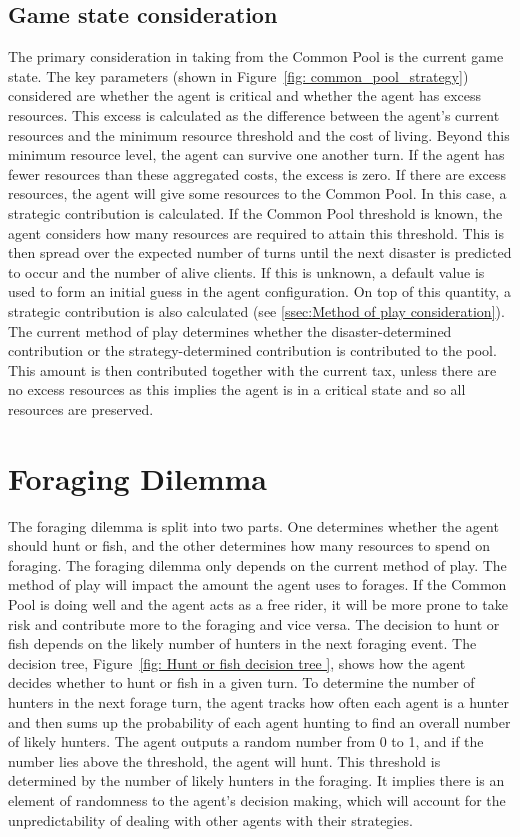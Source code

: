 \subsection{Game state consideration} \label{ssec:Game state consideration}
The primary consideration in taking from the Common Pool is the current game state. The key parameters (shown in Figure~\ref{fig: common_pool_strategy}) considered are whether the agent is critical and whether the agent has excess resources. This excess is calculated as the difference between the agent's current resources and the minimum resource threshold and the cost of living. Beyond this minimum resource level, the agent can survive one another turn. If the agent has fewer resources than these aggregated costs, the excess is zero. If there are excess resources, the agent will give some resources to the Common Pool. In this case, a strategic contribution is calculated. If the Common Pool threshold is known, the agent considers how many resources are required to attain this threshold. This is then spread over the expected number of turns until the next disaster is predicted to occur and the number of alive clients. If this is unknown, a default value is used to form an initial guess in the agent configuration. On top of this quantity, a strategic contribution is also calculated (see \ref{ssec:Method of play consideration}). The current method of play determines whether the disaster-determined contribution or the strategy-determined contribution is contributed to the pool. This amount is then contributed together with the current tax, unless there are no excess resources as this implies the agent is in a critical state and so all resources are preserved.

\section{Foraging Dilemma}
The foraging dilemma is split into two parts. One determines whether the agent should hunt or fish, and the other determines how many resources to spend on foraging. The foraging dilemma only depends on the current method of play. The method of play will impact the amount the agent uses to forages. If the Common Pool is doing well and the agent acts as a free rider, it will be more prone to take risk and contribute more to the foraging and vice versa. The decision to hunt or fish depends on the likely number of hunters in the next foraging event. The decision tree, Figure~\ref{fig: Hunt or fish decision tree }, shows how the agent decides whether to hunt or fish in a given turn. To determine the number of hunters in the next forage turn, the agent tracks how often each agent is a hunter and then sums up the probability of each agent hunting to find an overall number of likely hunters. The agent outputs a random number from 0 to 1, and if the number lies above the threshold, the agent will hunt. This threshold is determined by the number of likely hunters in the foraging. It implies there is an element of randomness to the agent's decision making, which will account for the unpredictability of dealing with other agents with their strategies.

